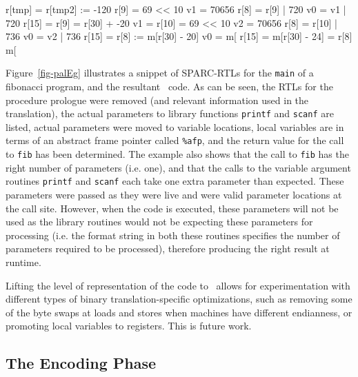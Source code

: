 \centerfigbegin
\begin{fnverbatim}
r[tmp] = %
r[tmp2] := -120
r[9] = 69 << 10            v1 = 70656
r[8] = r[9] | 720          v0 = v1 | 720
r[15] = %
r[9] = r[30] + -20         v1 = %
r[10] = 69 << 10           v2 = 70656
r[8] = r[10] | 736         v0 = v2 | 736
r[15] = %
r[8] := m[r[30] - 20]      v0 = m[%
r[15] = %
m[r[30] - 24] = r[8]       m[%
\end{fnverbatim}

Figure~\ref{fig-palEg} illustrates 
a snippet of SPARC-RTLs for the \texttt{main} of a fibonacci 
program, and the resultant \hrtl\ code.  As can be seen, 
the RTLs for the procedure prologue were removed (and relevant information
used in the translation), the actual parameters to library functions 
\texttt{printf} and \texttt{scanf} are listed, actual parameters 
were moved to variable locations, local variables are in terms of 
an abstract frame pointer called \texttt{\%afp}, and the return 
value for the call to \texttt{fib} has been determined.   
The example also shows that the call to \texttt{fib} has the
right number of parameters (i.e. one), and that the calls to
the variable argument routines \texttt{printf} and \texttt{scanf} 
each take one extra parameter than expected.  These parameters were passed 
as they were live and were valid parameter locations at the 
call site.  However, when the code is executed, these parameters
will not be used as the library routines would not be expecting
these parameters for processing (i.e. the format string 
in both these routines specifies the number of parameters
required to be processed), therefore producing the right
result at runtime.  

Lifting the level of representation of the code to \hrtl\ 
allows for experimentation with different types  
of binary translation-specific optimizations, such as removing 
some of the byte swaps at loads and stores when machines have  
different endianness, or promoting local variables to registers. 
This is future work. 


\subsection{The Encoding Phase} 
\label{sec-encoding}

